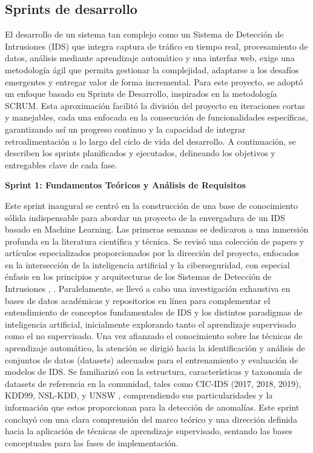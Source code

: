 \subsection{Sprints de desarrollo}\label{Sec.Sprints}
El desarrollo de un sistema tan complejo como un Sistema de Detección de Intrusiones (IDS) que integra captura de tráfico en tiempo real, procesamiento de datos, análisis mediante aprendizaje automático y una interfaz web, exige una metodología ágil que permita gestionar la complejidad, adaptarse a los desafíos emergentes y entregar valor de forma incremental. Para este proyecto, se adoptó un enfoque basado en Sprints de Desarrollo, inspirados en la metodología SCRUM. Esta aproximación facilitó la división del proyecto en iteraciones cortas y manejables, cada una enfocada en la consecución de funcionalidades específicas, garantizando así un progreso continuo y la capacidad de integrar retroalimentación a lo largo del ciclo de vida del desarrollo. A continuación, se describen los sprints planificados y ejecutados, delineando los objetivos y entregables clave de cada fase.


\textbf{Sprint 1: Fundamentos Teóricos y Análisis de Requisitos}

Este sprint inaugural se centró en la construcción de una base de conocimiento sólida indispensable para abordar un proyecto de la envergadura de un IDS basado en Machine Learning. Las primeras semanas se dedicaron a una inmersión profunda en la literatura científica y técnica. Se revisó una colección de papers y artículos especializados proporcionados por la dirección del proyecto, enfocados en la intersección de la inteligencia artificial y la ciberseguridad, con especial énfasis en los principios y arquitecturas de los Sistemas de Detección de Intrusiones \cite{Charmet2022XAI}, \cite{Zhang2022AICybersecurity}. Paralelamente, se llevó a cabo una investigación exhaustiva en bases de datos académicas y repositorios en línea para complementar el entendimiento de conceptos fundamentales de IDS y los distintos paradigmas de inteligencia artificial, inicialmente explorando tanto el aprendizaje supervisado como el no supervisado. Una vez afianzado el conocimiento sobre las técnicas de aprendizaje automático, la atención se dirigió hacia la identificación y análisis de conjuntos de datos (datasets) adecuados para el entrenamiento y evaluación de modelos de IDS. Se familiarizó con la estructura, características y taxonomía de datasets de referencia en la comunidad, tales como CIC-IDS (2017, 2018, 2019), KDD99, NSL-KDD, y UNSW \cite{PolaniaArias2021EvaluacionMLIDS}, comprendiendo sus particularidades y la información que estos proporcionan para la detección de anomalías. Este sprint concluyó con una clara comprensión del marco teórico y una dirección definida hacia la aplicación de técnicas de aprendizaje supervisado, sentando las bases conceptuales para las fases de implementación.

